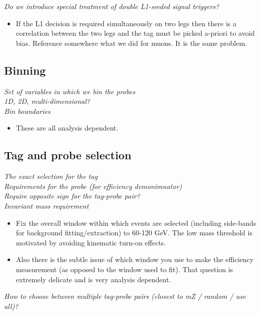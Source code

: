 \documentclass[11pt,a4paper]{article}
\begin{document}
{\it Do we introduce special treatment of double L1-seeded signal triggers?}\\
\begin{itemize}
    \item If the L1 decision is required simultaneously on two legs then there is 
a correlation between the two legs and the tag must be picked a-priori to
avoid bias.  Reference somewhere what we did for muons.  It is the same problem.
\end{itemize}


\subsection{Binning}

{\it Set of variables in which we bin the probes} \\
{\it 1D, 2D, multi-dimensional?} \\
{\it Bin boundaries} \\

\begin{itemize}
    \item These are all analysis dependent.
\end{itemize}

\subsection{Tag and probe selection}

{\it The exact selection for the tag} \\
{\it Requirements for the probe (for efficiency demonimnator)} \\
{\it Require opposite sign for the tag-probe pair?} \\
{\it Invariant mass requirement} \\

\begin{itemize}    
    \item Fix the overall window within which events are selected (including
side-bands for background fitting/extraction) to 60-120 GeV.  
The low mass threshold is motivated by avoiding kinematic turn-on effects.
    \item Also there is the subtle issue of which window you use to make the
efficiency measurement (as opposed to the window used to fit). That
question is extremely delicate and is very analysis dependent.
\end{itemize}

{\it How to choose between multiple tag-probe pairs (closest to mZ / random / use all)?} \\
\end{document}
